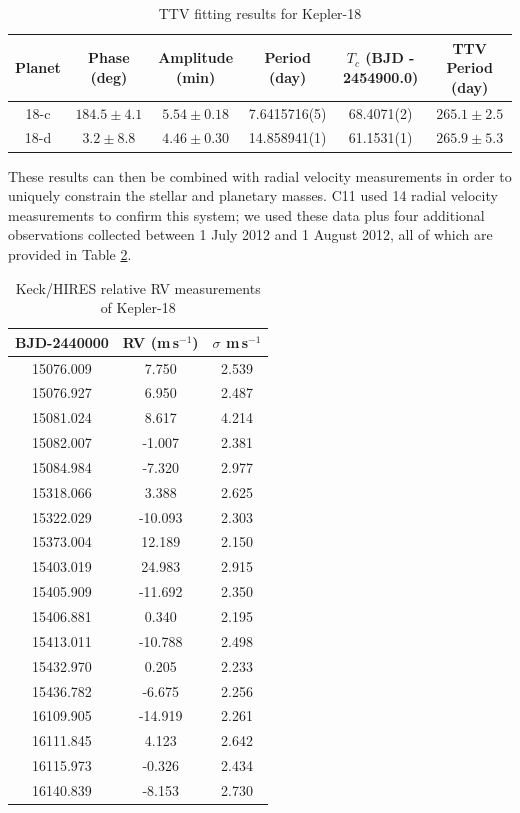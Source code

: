 \begin{table}[hbt!]
\scriptsize
\centering
\begin{tabular}{cccccc}
\hline
Planet & Phase (deg) & Amplitude (min) & Period (day) & $T_c$ (BJD - 2454900.0) &  TTV Period (day)\\
\hline
        18-c & $184.5 \pm 4.1$ & $5.54 \pm 0.18$ & 7.6415716(5) & 68.4071(2) & $265.1 \pm 2.5$ \\
        18-d & $3.2 \pm 8.8$ & $4.46 \pm 0.30$ & 14.858941(1) & 61.1531(1) & $265.9 \pm 5.3$\\
\hline
\end{tabular}
\caption{TTV fitting results for Kepler-18}
\label{TTVdata}
\end{table}


These results can then be combined with radial velocity measurements in order to uniquely constrain the stellar and planetary masses. C11 used 14 radial velocity measurements to confirm this system; we used these data plus four additional observations collected between 1 July 2012 and 1 August 2012, all of which are provided in Table \ref{RVels}.


\begin{table}[hbt!]
\centering
\begin{tabular}{ccc}
\hline
BJD-2440000 & RV (m\,s$^{-1}$)   & $\sigma$ m\,s$^{-1}$ \\
\hline
 15076.009  & 7.750   & 2.539\\
 15076.927  &  6.950  & 2.487\\
 15081.024  &  8.617  & 4.214\\
 15082.007  & -1.007  & 2.381\\
 15084.984  & -7.320  & 2.977\\
 15318.066  &  3.388  & 2.625\\
 15322.029  & -10.093 & 2.303\\
 15373.004  &  12.189 & 2.150\\
 15403.019  &  24.983 & 2.915\\
 15405.909  & -11.692 & 2.350\\
 15406.881  &  0.340  & 2.195\\
 15413.011  & -10.788 & 2.498\\
 15432.970  &  0.205  & 2.233\\
 15436.782  & -6.675  & 2.256\\
 16109.905  & -14.919 & 2.261\\
 16111.845  &  4.123  & 2.642\\
 16115.973  & -0.326  & 2.434\\
 16140.839  & -8.153  & 2.730\\
\hline
\end{tabular}
\caption{Keck/HIRES relative RV measurements of Kepler-18}
\label{RVels}
\end{table}

